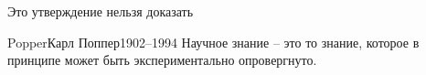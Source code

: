 \documentclass[aspectratio=169]{beamer}
\begin{document}

\begin{bframe}
\begin{center}
Это утверждение нельзя доказать
\end{center}
\end{bframe}

\begin{Person}{Popper}{Карл Поппер}{1902--1994}
Научное знание -- это то знание, которое в принципе может быть экспериментально опровергнуто.
\end{Person}
\end{document}
